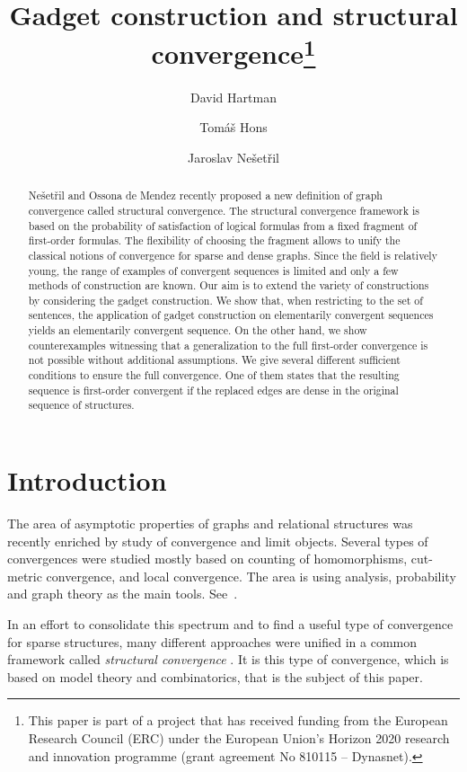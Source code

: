 \documentclass[11pt]{article}
\title{Gadget construction and structural convergence\thanks{This paper is part of a project that has received funding from the European Research Council (ERC) under the European Union’s Horizon 2020 research and innovation programme (grant agreement No 810115 – Dynasnet).}}
\author[1,2]{David Hartman}
\author[1]{Tom\'{a}\v{s} Hons}
\author[1]{Jaroslav Ne\v{s}et\v{r}il}
\affil[1]{\small Computer Science Institute, Faculty of Mathematics and Physics, Charles University, Prague, Czech Republic}
\affil[2]{\small Institute of Computer Science of the Czech Academy of Sciences, Prague, Czech Republic}
\date{}
\theoremstyle{plain}
\theoremstyle{definition}
\theoremstyle{remark}
\begin{document}
\maketitle

\begin{abstract}
Ne\v{s}et\v{r}il and Ossona de Mendez recently proposed a new definition of graph convergence called structural convergence.
The structural convergence framework is based on the probability of satisfaction of logical formulas from a fixed fragment of first-order formulas.
The flexibility of choosing the fragment allows to unify the classical notions of convergence for sparse and dense graphs.
Since the field is relatively young, the range of examples of convergent sequences is limited and only a few methods of construction are known.
Our aim is to extend the variety of constructions by considering the gadget construction.
We show that, when restricting to the set of sentences, the application of gadget construction on elementarily convergent sequences yields an elementarily convergent sequence.
On the other hand, we show counterexamples witnessing that a generalization to the full first-order convergence is not possible without additional assumptions.
We give several different sufficient conditions to ensure the full convergence.
One of them states that the resulting sequence is first-order convergent if the replaced edges are dense in the original sequence of structures.
\end{abstract}

\tableofcontents

\section{Introduction}\label{sec:introduction}


The area of asymptotic properties of graphs and relational structures was recently enriched by study of convergence and limit objects.
Several types of convergences were studied mostly based on counting of homomorphisms, cut-metric convergence, and local convergence.
The area is using analysis, probability and graph theory as the main tools.
See~\cite{large_networks}\cite{counting_graph_homomorphism}\cite{limits_of_dense_graph_sequences}\cite{benjamini_schramm}\cite{elek}\cite{elek_tardos}.

In an effort to consolidate this spectrum and to find a useful type of convergence for sparse structures, many different approaches were unified in a common framework called \emph{structural convergence} \cite{unified_approach}\cite{clustering}.
It is this type of convergence, which is based on model theory and combinatorics, that is the subject of this paper.
\end{document}
